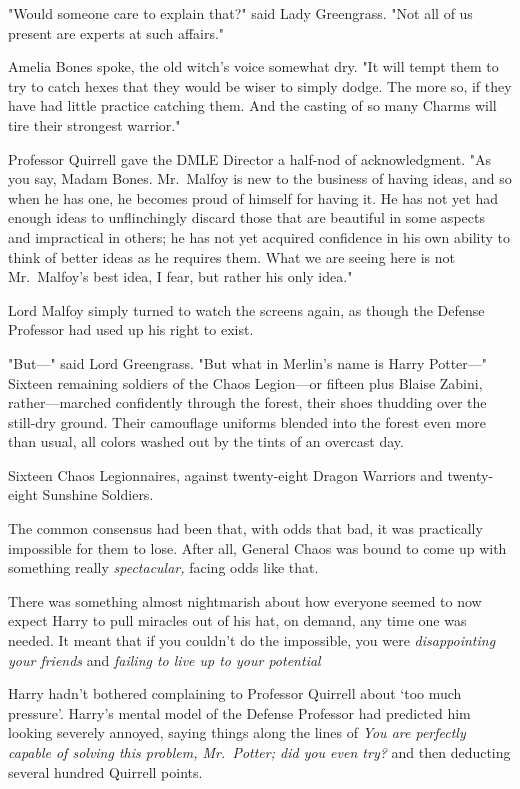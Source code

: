 "Would someone care to explain that?" said Lady Greengrass. "Not all of us
present are experts at such{\el} affairs."

Amelia Bones spoke, the old witch's voice somewhat dry. "It will tempt them to
try to catch hexes that they would be wiser to simply dodge. The more so, if
they have had little practice catching them. And the casting of so many Charms
will tire their strongest warrior."

Professor Quirrell gave the DMLE Director a half-nod of acknowledgment. "As you
say, Madam Bones. Mr.~Malfoy is new to the business of having ideas, and so
when he has one, he becomes proud of himself for having it. He has not yet had
enough ideas to unflinchingly discard those that are beautiful in some aspects
and impractical in others; he has not yet acquired confidence in his own
ability to think of better ideas as he requires them. What we are seeing here
is not Mr.~Malfoy's best idea, I fear, but rather his only idea."

Lord Malfoy simply turned to watch the screens again, as though the Defense
Professor had used up his right to exist.

"But---" said Lord Greengrass. "But what in Merlin's name is Harry Potter---"
\sbreak
Sixteen remaining soldiers of the Chaos Legion---or fifteen plus Blaise Zabini,
rather---marched confidently through the forest, their shoes thudding over the
still-dry ground. Their camouflage uniforms blended into the forest even more
than usual, all colors washed out by the tints of an overcast day.

Sixteen Chaos Legionnaires, against twenty-eight Dragon Warriors and
twenty-eight Sunshine Soldiers.

The common consensus had been that, with odds that bad, it was practically
impossible for them to lose. After all, General Chaos was bound to come up with
something really \emph{spectacular,} facing odds like that.

There was something almost nightmarish about how everyone seemed to now expect
Harry to pull miracles out of his hat, on demand, any time one was needed. It
meant that if you couldn't do the impossible, you were \emph{disappointing your
friends} and \emph{failing to live up to your potential{\el}}

Harry hadn't bothered complaining to Professor Quirrell about `too much
pressure'. Harry's mental model of the Defense Professor had predicted him
looking severely annoyed, saying things along the lines of \emph{You are
perfectly capable of solving this problem, Mr.~Potter; did you even try?} and
then deducting several hundred Quirrell points.

